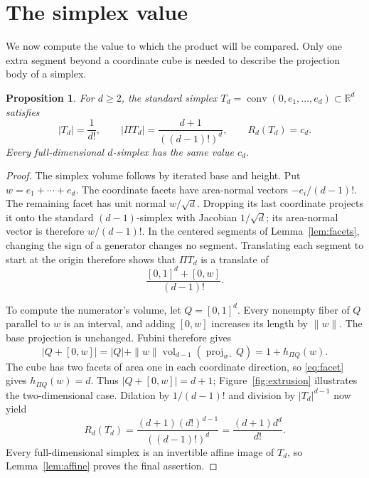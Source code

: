 \documentclass[11pt]{article}
\newtheorem{proposition}[theorem]{Proposition}
\newcommand{\R}{\mathbb R}
\DeclareMathOperator{\conv}{conv}
\DeclareMathOperator{\vol}{vol}
\DeclareMathOperator{\proj}{proj}
\begin{document}
\section{The simplex value}\label{sec:simplex}

We now compute the value to which the product will be compared.
Only one extra segment beyond a coordinate cube is needed to describe
the projection body of a simplex.

\begin{proposition}\label{prop:simplex}
For \(d\ge2\), the standard simplex
\(T_d=\conv(0,e_1,\ldots,e_d)\subset\R^d\) satisfies
\[
 |T_d|=\frac1{d!},\qquad
 |\Pi T_d|=\frac{d+1}{((d-1)!)^d},\qquad
 R_d(T_d)=c_d.
\]
Every full-dimensional \(d\)-simplex has the same value \(c_d\).
\end{proposition}

\begin{proof}
The simplex volume follows by iterated base and height. Put
\(w=e_1+\cdots+e_d\). The coordinate facets have area-normal vectors
\(-e_i/(d-1)!\). The remaining facet has unit normal \(w/\sqrt d\).
Dropping its last coordinate projects it onto the standard
\((d-1)\)-simplex with Jacobian \(1/\sqrt d\); its area-normal vector is
therefore \(w/(d-1)!\). In the centered segments of
Lemma~\ref{lem:facets}, changing the sign of a generator changes no
segment. Translating each segment to start at the origin therefore shows
that \(\Pi T_d\) is a translate of
\[
 \frac{[0,1]^d+[0,w]}{(d-1)!}.
\]

To compute the numerator's volume, let \(Q=[0,1]^d\).
Every nonempty fiber of \(Q\) parallel to \(w\) is an interval, and
adding \([0,w]\) increases its length by \(\|w\|\).
The base projection is unchanged. Fubini therefore gives
\[
 |Q+[0,w]|
 =|Q|+\|w\|\vol_{d-1}(\proj_{w^\perp}Q)
 =1+h_{\Pi Q}(w).
\]
The cube has two facets of area one in each coordinate direction,
so \eqref{eq:facet} gives \(h_{\Pi Q}(w)=d\).
Thus \(|Q+[0,w]|=d+1\); Figure~\ref{fig:extrusion} illustrates the
two-dimensional case. Dilation by \(1/(d-1)!\) and division by
\(|T_d|^{d-1}\) now yield
\[
 R_d(T_d)=\frac{(d+1)(d!)^{d-1}}{((d-1)!)^d}
         =\frac{(d+1)d^d}{d!}.
\]
Every full-dimensional simplex is an invertible affine image of
\(T_d\), so Lemma~\ref{lem:affine} proves the final assertion.
\end{proof}
\end{document}

